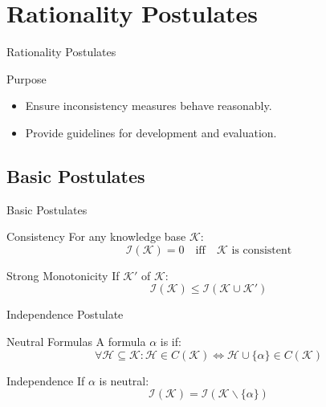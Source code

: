 \section{Rationality Postulates}

\begin{frame}{Rationality Postulates}
    \begin{block}{Purpose}
        \begin{itemize}
            \item Ensure inconsistency measures behave reasonably.
            \item Provide guidelines for development and evaluation.
        \end{itemize}
    \end{block}
\end{frame}

\subsection{Basic Postulates}

\begin{frame}{Basic Postulates}
    \begin{block}{Consistency}
        For any knowledge base $\mathcal{K}$:
        \[
            \mathcal{I}(\mathcal{K}) = 0 \quad \text{iff} \quad \mathcal{K} \text{ is consistent}
        \]
    \end{block}
    \begin{block}{Strong Monotonicity}
        If $\mathcal{K}'$  of $\mathcal{K}$:
        \[
            \mathcal{I}(\mathcal{K}) \leq \mathcal{I}(\mathcal{K} \cup \mathcal{K}')
        \]
    \end{block}
\end{frame}

\begin{frame}{Independence Postulate}
    \begin{block}{Neutral Formulas}
        A formula $\alpha$ is  if:
        \[
            \forall \mathcal{H} \subseteq \mathcal{K}: \mathcal{H} \in C(\mathcal{K}) \Leftrightarrow \mathcal{H} \cup \{\alpha\} \in C(\mathcal{K})
        \]
    \end{block}
    \begin{block}{Independence}
        If $\alpha$ is neutral:
        \[
            \mathcal{I}(\mathcal{K}) = \mathcal{I}(\mathcal{K} \backslash \{\alpha\})
        \]
    \end{block}
\end{frame}

